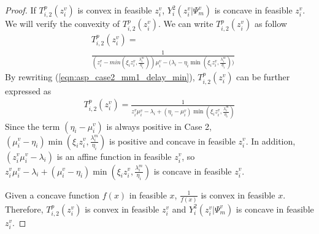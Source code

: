\documentclass[10pt,journal, compsoc]{IEEEtran}
\begin{document}
\begin{proof}
If $T_{i,2}^p(z_i^v)$ is convex in feasible $z_i^v$, $Y_i^2(z_i^v|\Psi_m^v)$ is concave in feasible $z_i^v$. We will verify the convexity of $T_{i,2}^p(z_i^v)$. We can write $T_{i,2}^p(z_i^v)$ as follow
\begin{equation} \label{eqn:asp_case2_mm1_delay_min}
\begin{aligned}
&T_{i,2}^p(z_i^v) = \\ &\frac{1}{(z_i^v-min(\xi_i z_i^v, \frac{\lambda_i^m}{\eta_i}))\mu_i^v - \big(\lambda_i - \eta_i\min(\xi_i z_i^v, \frac{\lambda_i^m}{\eta_i})\big)}
\end{aligned}
\end{equation}
By rewriting (\ref{eqn:asp_case2_mm1_delay_min}), $T_{i,2}^p(z_i^v)$ can be further expressed as
\begin{equation} \label{eqn:asp_case2_mm1_delay_min_new}
\begin{aligned}
T_{i,2}^p(z_i^v) = \frac{1}{z_i^v\mu_i^v - \lambda_i +(\eta_i - \mu_i^v)\min(\xi_i z_i^v, \frac{\lambda_i^m}{\eta_i})}
\end{aligned}
\end{equation}
Since the term $(\eta_i - \mu_i^v)$ is always positive in Case 2, $(\mu_i^v - \eta_i)\min(\xi_i z_i^v, \frac{\lambda_i^m}{\eta_i})$ is positive and concave in feasible $z_i^v$. In addition, $(z_i^v\mu_i^v - \lambda_i)$ is an affine function in feasible $z_i^v$, so $z_i^v\mu_i^v - \lambda_i+(\mu_i^v - \eta_i)\min(\xi_i z_i^v, \frac{\lambda_i^m}{\eta_i})$ is concave in feasible $z_i^v$\cite[Chapter~3.2]{boyd2004convex}.

Given a concave function $f(x)$ in feasible $x$, $\frac{1}{f(x)}$ is convex in feasible $x$. Therefore, $T_{i,2}^p(z_i^v)$ is convex in feasible $z_i^v$ and $Y_i^2(z_i^v|\Psi_m^v)$ is concave in feasible $z_i^v$.  \qedhere
\iffalse


\end{proof}
\end{document}
